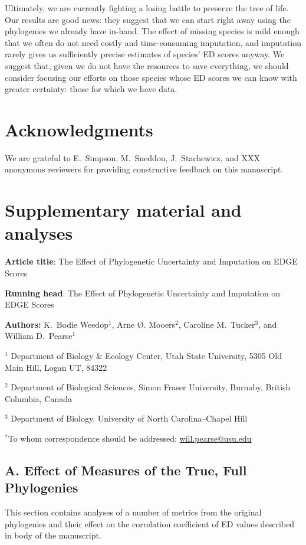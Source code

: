 \documentclass[12pt,english]{article}
\begin{document}
Ultimately, we are currently fighting a losing battle to preserve the tree of
life. Our results are good news: they suggest that we can start right away using
the phylogenies we already have in-hand. The effect of missing species is mild
enough that we often do not need costly and time-consuming imputation, and
imputation rarely gives us sufficiently precise estimates of species' ED scores
anyway. We suggest that, given we do not have the resources to save everything,
we should consider focusing our efforts on those species whose ED scores we can
know with greater certainty: those for which we have data.

\section*{Acknowledgments}
We are grateful to E.\ Simpson, M.\ Sneddon, J.\ Stachewicz, and XXX
anonymous reviewers for providing constructive feedback on this
manuscript.

\clearpage
\printbibliography

\clearpage
\appendix 
\section*{Supplementary material and analyses}
\textbf{Article title}: The Effect of Phylogenetic Uncertainty and Imputation on EDGE Scores

\textbf{Running head}: The Effect of Phylogenetic Uncertainty and Imputation on EDGE Scores

\textbf{Authors:} K.\ Bodie Weedop$^{1}$, Arne \O. Mooers$^2$, Caroline M.\ Tucker$^3$, and William D.\ Pearse$^{1}$\

$^1$ Department of Biology \& Ecology Center, Utah State University,
5305 Old Main Hill, Logan UT, 84322

$^2$ Department of Biological Sciences, Simon Fraser University, Burnaby,
British Columbia, Canada

$^3$ Department of Biology, University of North Carolina–Chapel Hill

$^*$To whom correspondence should be addressed:
\url{will.pearse@usu.edu}
\clearpage
\subsection*{A. Effect of Measures of the True, Full Phylogenies}

This section contains analyses of a number of metrics from the original
phylogenies and their effect on the correlation coefficient of ED values
described in body of the manuscript.
\end{document}
